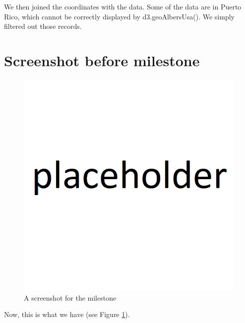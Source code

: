 We then joined the coordinates with the data. Some of the data are in Puerto
Rico, which cannot be correctly displayed by d3.geoAlbersUsa(). We simply
filtered out those records.

\newpage

\section{Screenshot before milestone}

\begin{figure}[!h]
    \centering
    \includegraphics[width=\textwidth]{fig/placeholder}
    \caption{A screenshot for the milestone}
    \label{fig:milestone}
\end{figure}
Now, this is what we have (see Figure \ref{fig:milestone}).
